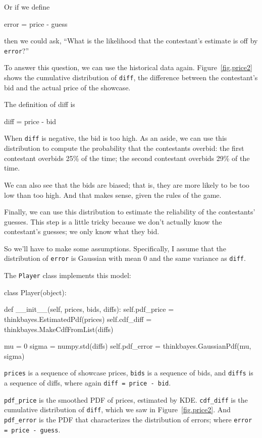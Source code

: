 \documentclass[12pt]{book}
\theoremstyle{exercise}
\begin{document}
Or if we define
%
\begin{code}
    error = price - guess
\end{code}
%
then we could ask, ``What is the likelihood
that the contestant's estimate is off by {\tt error}?''

To answer this question, we can use the historical data again.
Figure~\ref{fig.price2} shows the cumulative distribution of {\tt diff},
the difference between the contestant's bid and the actual price
of the showcase.

The definition of diff is
%
\begin{code}
    diff = price - bid
\end{code}
%
When {\tt diff} is negative, the bid is too high.  As an
aside, we can use this distribution to compute the probability that the
contestants overbid: the first contestant overbids 25\% of the
time; the second contestant overbids 29\% of the time.

We can also see that the bids are biased;
that is, they are more likely to be too low than too high.  And
that makes sense, given the rules of the game.

Finally, we can use this distribution to estimate the reliability of
the contestants' guesses.  This step is a little tricky because
we don't actually know the contestant's guesses; we only know
what they bid.

So we'll have to make some assumptions.  Specifically, I
assume that the distribution of {\tt error} is Gaussian with mean 0
and the same variance as {\tt diff}.

The {\tt Player} class implements this model:

\begin{code}
class Player(object):

    def __init__(self, prices, bids, diffs):
        self.pdf_price = thinkbayes.EstimatedPdf(prices)
        self.cdf_diff = thinkbayes.MakeCdfFromList(diffs)

        mu = 0
        sigma = numpy.std(diffs)
        self.pdf_error = thinkbayes.GaussianPdf(mu, sigma)
\end{code}

{\tt prices} is a sequence of showcase prices, {\tt bids} is a
sequence of bids, and {\tt diffs} is a sequence of diffs, where
again {\tt diff = price - bid}.

\verb"pdf_price" is the smoothed PDF of prices, estimated by KDE.
\verb"cdf_diff" is the cumulative distribution of {\tt diff},
which we saw in Figure~\ref{fig.price2}.  And \verb"pdf_error"
is the PDF that characterizes the distribution of errors; where
{\tt error = price - guess}.
\end{document}
